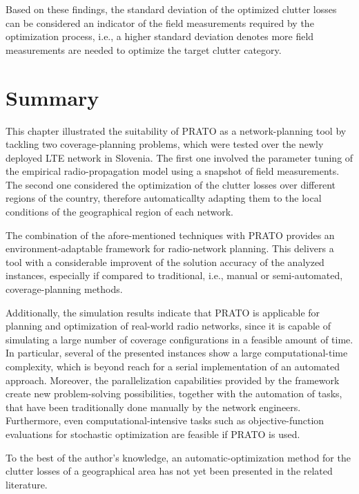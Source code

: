 Based on these findings, the standard deviation of the optimized clutter
losses can be considered an indicator of the field measurements required
by the optimization process, i.e., a higher standard deviation denotes
more field measurements are needed to optimize the target clutter
category.


\section{Summary}

This chapter illustrated the suitability of PRATO as a network-planning
tool by tackling two coverage-planning problems, which were tested
over the newly deployed LTE network in Slovenia. The first one involved
the parameter tuning of the empirical radio-propagation model using
a snapshot of field measurements. The second one considered the optimization
of the clutter losses over different regions of the country, therefore
automaticallty adapting them to the local conditions of the geographical
region of each network.

The combination of the afore-mentioned techniques with PRATO provides
an environment-adaptable framework for radio-network planning. This
delivers a tool with a considerable improvent of the solution accuracy
of the analyzed instances, especially if compared to traditional,
i.e., manual or semi-automated, coverage-planning methods.

Additionally, the simulation results indicate that PRATO is applicable
for planning and optimization of real-world radio networks, since
it is capable of simulating a large number of coverage configurations
in a feasible amount of time. In particular, several of the presented
instances show a large computational-time complexity, which is beyond
reach for a serial implementation of an automated approach. Moreover,
the parallelization capabilities provided by the framework create
new problem-solving possibilities, together with the automation of
tasks, that have been traditionally done manually by the network engineers.
Furthermore, even computational-intensive tasks such as objective-function
evaluations for stochastic optimization are feasible if PRATO is used.

To the best of the author's knowledge, an automatic-optimization method
for the clutter losses of a geographical area has not yet been presented
in the related literature.
